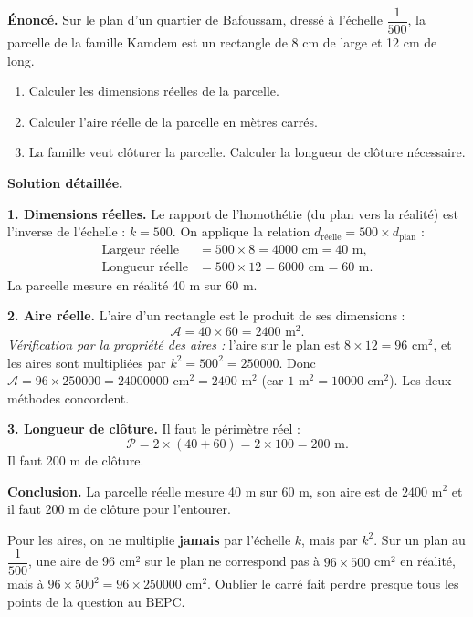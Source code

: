 \documentclass[11pt]{article}
\newcounter{popsec}
\newcounter{popsub}
\newcommand{\courssub}[1]{%
  \stepcounter{popsub}%
  \par\vspace{9pt}\noindent{\popxbold\fontsize{11.5}{13}\selectfont\color{popink}{\color{poporange}\thepopsec.\thepopsub}\hspace{6pt}#1}\par\nopagebreak\vspace{4pt}
}
\begin{document}
\courssub{Problème de synthèse guidé}

\begin{exoresolu}
\textbf{Énoncé.} Sur le plan d'un quartier de Bafoussam, dressé à l'échelle $\dfrac{1}{500}$, la parcelle de la famille Kamdem est un rectangle de 8 cm de large et 12 cm de long.
\begin{enumerate}
\item Calculer les dimensions réelles de la parcelle.
\item Calculer l'aire réelle de la parcelle en mètres carrés.
\item La famille veut clôturer la parcelle. Calculer la longueur de clôture nécessaire.
\end{enumerate}
\tcblower
\textbf{Solution détaillée.}

\textbf{1. Dimensions réelles.} Le rapport de l'homothétie (du plan vers la réalité) est l'inverse de l'échelle : $k = 500$. On applique la relation $d_{\text{réelle}} = 500 \times d_{\text{plan}}$ :
\begin{align*}
\text{Largeur réelle} &= 500 \times 8 = \num{4000} \text{ cm} = 40 \text{ m},\\
\text{Longueur réelle} &= 500 \times 12 = \num{6000} \text{ cm} = 60 \text{ m}.
\end{align*}
La parcelle mesure en réalité 40 m sur 60 m.

\textbf{2. Aire réelle.} L'aire d'un rectangle est le produit de ses dimensions :
\[ \mathcal{A} = 40 \times 60 = \num{2400} \text{ m}^2. \]
\emph{Vérification par la propriété des aires :} l'aire sur le plan est $8 \times 12 = 96$ cm$^2$, et les aires sont multipliées par $k^2 = 500^2 = \num{250000}$. Donc $\mathcal{A} = 96 \times \num{250000} = \num{24000000}$ cm$^2 = \num{2400}$ m$^2$ (car $1$ m$^2 = \num{10000}$ cm$^2$). Les deux méthodes concordent.

\textbf{3. Longueur de clôture.} Il faut le périmètre réel :
\[ \mathcal{P} = 2 \times (40 + 60) = 2 \times 100 = 200 \text{ m}. \]
Il faut 200 m de clôture.

\textbf{Conclusion.} La parcelle réelle mesure 40 m sur 60 m, son aire est de $\num{2400}$ m$^2$ et il faut 200 m de clôture pour l'entourer.
\end{exoresolu}

\begin{attention}
Pour les aires, on ne multiplie \textbf{jamais} par l'échelle $k$, mais par $k^2$. Sur un plan au $\dfrac{1}{500}$, une aire de 96 cm$^2$ sur le plan ne correspond pas à $96 \times 500$ cm$^2$ en réalité, mais à $96 \times 500^2 = 96 \times \num{250000}$ cm$^2$. Oublier le carré fait perdre presque tous les points de la question au BEPC.
\end{attention}
\end{document}
